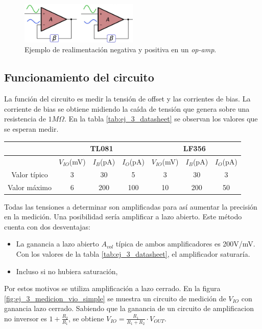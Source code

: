 \documentclass[../../main.tex]{subfiles}
\begin{document}
\begin{figure}[htbp] %
	\centering
	\includegraphics[width=0.5\textwidth]{imagenes/pos_vs_neg_feedback.png}
	\caption{Ejemplo de realimentaci\'on negativa y positiva en un \textit{op-amp}.}
	\label{fig:ej_3_realimentacion_pos_vs_neg_opamp}
\end{figure}










\subsection{Funcionamiento del circuito}
La funci\'on del circuito es medir la tensi\'on de offset y las corrientes de bias. La corriente de bias se obtiene midiendo la ca\'ida de tensi\'on que genera sobre una resistencia de $1M\Omega$. En la tabla \ref{tab:ej_3_datasheet} se observan los valores que se esperan medir.


\begin{table}[htbp]
\centering
\begin{tabular}{ccccccc}
               & \multicolumn{3}{c}{TL081}            & \multicolumn{3}{c}{LF356}    \\
\hline              
               & $V_{IO}$(mV) & $I_B$(pA) & $I_O$(pA) & $V_{IO}$(mV) & $I_B$(pA) & $I_O$(pA) \\
\hline
Valor t\'ipico & 3            & 30        & 5         & 3            & 30    & 3     \\
Valor m\'aximo & 6            & 200       & 100       & 10           & 200   & 50   
\end{tabular}
\end{table}

Todas las tensiones a determinar son amplificadas para as\'i aumentar la precisi\'on en la medici\'on. Una posibilidad ser\'ia amplificar a lazo abierto. Este m\'etodo cuenta con dos desventajas:
\begin{itemize}	%
	\item La ganancia a lazo abierto $A_{vol}$ t\'ipica de ambos amplificadores es 200V/mV. Con los valores de la tabla \ref{tab:ej_3_datasheet}, el amplificador saturar\'ia.
	\item Incluso si no hubiera saturaci\'on, 
\end{itemize}
Por estos motivos se utiliza amplificaci\'on a lazo cerrado. En la figura \ref{fig:ej_3_medicion_vio_simple} se muestra un circuito de medici\'on de $V_{IO}$ con ganancia lazo cerrado. Sabiendo que la ganancia de un circuito de amplificacion no inversor es $1+\frac{R_2}{R_1}$, se obtiene $V_{IO}=\frac{R_1}{R_1+R_2}\cdot V_{OUT}$. 
\end{document}
